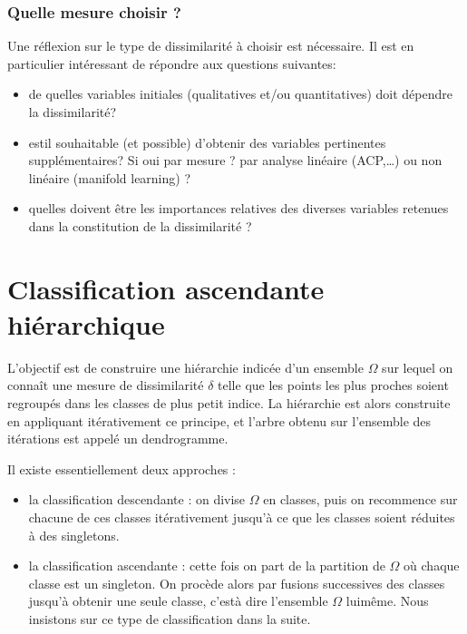 \documentclass[letterpaper,10pt,english]{jupyterBook}
\begin{document}
\subsubsection{Quelle mesure choisir ?}
\label{\detokenize{clustering:quelle-mesure-choisir}}
\sphinxAtStartPar
Une réflexion  sur le type de dissimilarité à choisir est nécessaire. Il est en particulier intéressant de répondre aux questions suivantes:
\begin{itemize}
\item {} 
\sphinxAtStartPar
de quelles variables initiales (qualitatives et/ou quantitatives) doit dépendre la dissimilarité?

\item {} 
\sphinxAtStartPar
est\sphinxhyphen{}il souhaitable (et possible) d’obtenir des variables pertinentes supplémentaires? Si oui par mesure ? par analyse linéaire (ACP,…) ou non linéaire (manifold learning) ?

\item {} 
\sphinxAtStartPar
quelles doivent être les importances relatives des diverses variables retenues dans la constitution de la dissimilarité ?

\end{itemize}


\section{Classification ascendante hiérarchique}
\label{\detokenize{clustering:classification-ascendante-hierarchique}}
\sphinxAtStartPar
L’objectif est de construire une hiérarchie indicée d’un ensemble \(\Omega\) sur lequel on connaît une mesure de dissimilarité \(\delta\) telle que les points les plus proches soient regroupés dans les classes de plus petit indice. La hiérarchie est alors construite en appliquant itérativement ce principe, et l’arbre obtenu sur l’ensemble des itérations est appelé un dendrogramme.

\sphinxAtStartPar
Il existe essentiellement
deux approches :
\begin{itemize}
\item {} 
\sphinxAtStartPar
la classification descendante : on divise \(\Omega\) en classes, puis on recommence sur chacune de ces classes itérativement jusqu’à ce que les classes soient réduites à des singletons.

\item {} 
\sphinxAtStartPar
la classification ascendante : cette fois on part de la partition de \(\Omega\)  où chaque classe est un singleton. On procède alors par fusions successives des classes jusqu’à obtenir une seule classe, c’est\sphinxhyphen{}à \sphinxhyphen{}dire l’ensemble  \(\Omega\) lui\sphinxhyphen{}même. Nous insistons sur ce type de classification dans la suite.

\end{itemize}
\end{document}
